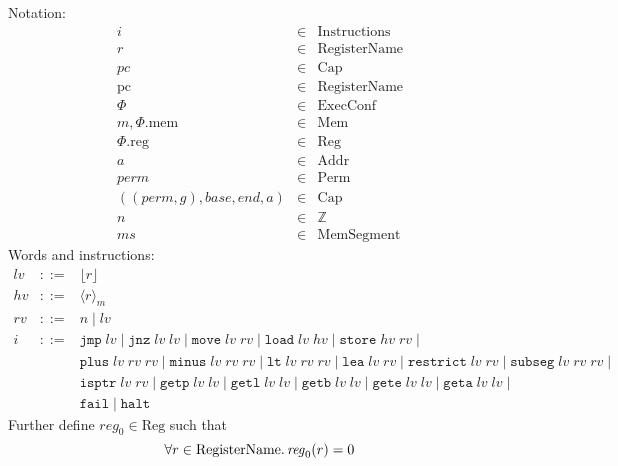 \documentclass[a4paper]{article}
\newcommand{\var}[1]{\mathit{#1}}
\newcommand{\hs}{\var{ms}}
\newcommand{\ms}{\hs}
\newcommand{\hv}{\var{hv}}
\newcommand{\rv}{\var{rv}}
\newcommand{\lv}{\var{lv}}
\newcommand{\gl}{\var{g}}
\newcommand{\pc}{\mathit{pc}}
\newcommand{\pcreg}{\mathrm{pc}}
\newcommand{\addr}{\var{a}}
\newcommand{\start}{\var{base}}
\newcommand{\addrend}{\var{end}}
\newcommand{\reg}{\var{reg}}
\newcommand{\perm}{\var{perm}}
\newcommand{\plainproj}[1]{\mathrm{#1}}
\newcommand{\memheap}[1][\Phi]{#1.\plainproj{mem}}
\newcommand{\memreg}[1][\Phi]{#1.\plainproj{reg}}
\newcommand{\plaindom}[1]{\mathrm{#1}}
\newcommand{\Caps}{\plaindom{Cap}}
\newcommand{\Addrs}{\plaindom{Addr}}
\newcommand{\ExecConfs}{\plaindom{ExecConf}}
\newcommand{\RegName}{\plaindom{RegisterName}}
\newcommand{\Regs}{\plaindom{Reg}}
\newcommand{\Heaps}{\plaindom{Mem}}
\newcommand{\HeapSegments}{\plaindom{MemSegment}}
\newcommand{\MemSegments}{\HeapSegments}
\newcommand{\Instrs}{\plaindom{Instructions}}
\newcommand{\ints}{\mathbb{Z}}
\newcommand{\Perms}{\plaindom{Perm}}
\newcommand{\refreg}[1]{\lfloor #1 \rfloor}
\newcommand{\refheap}[1]{\langle #1 \rangle_m}
\newcommand{\zinstr}[1]{\mathtt{#1}}
\newcommand{\fail}{\zinstr{fail}}
\newcommand{\halt}{\zinstr{halt}}
\newcommand{\oneinstr}[2]{\zinstr{#1} \; #2}
\newcommand{\jmp}[1]{\oneinstr{jmp}{#1}}
\newcommand{\twoinstr}[3]{\zinstr{#1} \; #2 \; #3}
\newcommand{\restricttwo}[2]{\twoinstr{restrict}{#1}{#2}}
\newcommand{\jnz}[2]{\twoinstr{jnz}{#1}{#2}}
\newcommand{\isptr}[2]{\twoinstr{isptr}{#1}{#2}}
\newcommand{\geta}[2]{\twoinstr{geta}{#1}{#2}}
\newcommand{\getb}[2]{\twoinstr{getb}{#1}{#2}}
\newcommand{\gete}[2]{\twoinstr{gete}{#1}{#2}}
\newcommand{\getp}[2]{\twoinstr{getp}{#1}{#2}}
\newcommand{\getl}[2]{\twoinstr{getl}{#1}{#2}}
\newcommand{\move}[2]{\twoinstr{move}{#1}{#2}}
\newcommand{\store}[2]{\twoinstr{store}{#1}{#2}}
\newcommand{\load}[2]{\twoinstr{load}{#1}{#2}}
\newcommand{\lea}[2]{\twoinstr{lea}{#1}{#2}}
\newcommand{\threeinstr}[4]{\zinstr{#1} \; #2 \; #3 \; #4}
\newcommand{\subseg}[3]{\threeinstr{subseg}{#1}{#2}{#3}}
\newcommand{\plus}[3]{\threeinstr{plus}{#1}{#2}{#3}}
\newcommand{\minus}[3]{\threeinstr{minus}{#1}{#2}{#3}}
\newcommand{\lt}[3]{\threeinstr{lt}{#1}{#2}{#3}}
\begin{document}
Notation:
\[
  \begin{array}{rcl}
    i       &\in& \Instrs \\
    r       &\in& \RegName\\
    \pc     &\in& \Caps \\
    \pcreg  &\in& \RegName \\
    \Phi    &\in& \ExecConfs \\
    m, \memheap&\in& \Heaps \\
    \memreg &\in& \Regs \\
    \addr   &\in& \Addrs\\
    \perm   &\in& \Perms\\
    ((\perm,\gl),\start,\addrend,\addr) &\in& \Caps \\
    n       &\in& \ints\\
    \ms     &\in& \MemSegments
  \end{array}
\]
Words and instructions:
\[
  \begin{array}{rcl}
    \lv    &::=& \refreg{r} \\
    \hv    &::=& \refheap{r}\\
    \rv    &::=& n \mid \lv \\
    i      &::=& 
                 \jmp{\lv} \mid 
                 \jnz{\lv}{\lv} \mid
                 \move{\lv}{\rv} \mid 
                 \load{\lv}{\hv} \mid 
                 \store{\hv}{\rv} \mid  \\
           &   & \plus{\lv}{\rv}{\rv} \mid 
                 \minus{\lv}{\rv}{\rv} \mid 
                 \lt{\lv}{\rv}{\rv} \mid 
                 \lea{\lv}{\rv} \mid 
                 \restricttwo{\lv}{\rv} \mid 
                 \subseg{\lv}{\rv}{\rv} \mid  \\
           &   & \isptr{\lv}{\rv} \mid 
                 \getp{\lv}{\lv} \mid 
                 \getl{\lv}{\lv} \mid 
                 \getb{\lv}{\lv} \mid
                 \gete{\lv}{\lv} \mid
                 \geta{\lv}{\lv} \mid \\
           &   & \fail \mid
                 \halt 
  \end{array}
\]
Further define $\reg_0 \in \Regs$ such that
\[
  \forall r \in \RegName \ldotp \reg_0(r) = 0
\]
\end{document}
